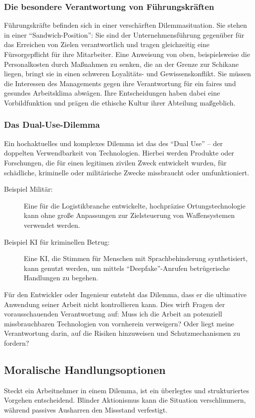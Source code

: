 \documentclass[
    12pt,               %
    a4paper,            %
    ngerman             %
]{scrartcl}
\begin{document}
\subsubsection*{Die besondere Verantwortung von Führungskräften}
Führungskräfte befinden sich in einer verschärften Dilemmasituation. Sie stehen in einer \enquote{Sandwich-Position}: Sie sind der Unternehmensführung gegenüber für das Erreichen von Zielen verantwortlich und tragen gleichzeitig eine Fürsorgepflicht für ihre Mitarbeiter. Eine Anweisung von oben, beispielsweise die Personalkosten durch Maßnahmen zu senken, die an der Grenze zur Schikane liegen, bringt sie in einen schweren Loyalitäts- und Gewissenskonflikt. Sie müssen die Interessen des Managements gegen ihre Verantwortung für ein faires und gesundes Arbeitsklima abwägen. Ihre Entscheidungen haben dabei eine Vorbildfunktion und prägen die ethische Kultur ihrer Abteilung maßgeblich.

\subsubsection*{Das Dual-Use-Dilemma}
Ein hochaktuelles und komplexes Dilemma ist das des \enquote{Dual Use} – der doppelten Verwendbarkeit von Technologien. Hierbei werden Produkte oder Forschungen, die für einen legitimen zivilen Zweck entwickelt wurden, für schädliche, kriminelle oder militärische Zwecke missbraucht oder umfunktioniert.
\begin{description}
    \item[Beispiel Militär:] Eine für die Logistikbranche entwickelte, hochpräzise Ortungstechnologie kann ohne große Anpassungen zur Zielsteuerung von Waffensystemen verwendet werden.
    \item[Beispiel KI für kriminellen Betrug:] Eine KI, die Stimmen für Menschen mit Sprachbehinderung synthetisiert, kann genutzt werden, um mittels \enquote{Deepfake}-Anrufen betrügerische Handlungen zu begehen.
\end{description}
Für den Entwickler oder Ingenieur entsteht das Dilemma, dass er die ultimative Anwendung seiner Arbeit nicht kontrollieren kann. Dies wirft Fragen der vorausschauenden Verantwortung auf: Muss ich die Arbeit an potenziell missbrauchbaren Technologien von vornherein verweigern? Oder liegt meine Verantwortung darin, auf die Risiken hinzuweisen und Schutzmechanismen zu fordern?

\subsection{Moralische Handlungsoptionen}
Steckt ein Arbeitnehmer in einem Dilemma, ist ein überlegtes und strukturiertes Vorgehen entscheidend. Blinder Aktionismus kann die Situation verschlimmern, während passives Ausharren den Missstand verfestigt.
\end{document}

